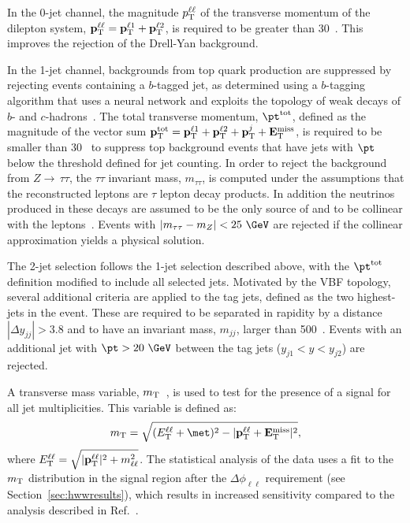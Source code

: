 \documentclass[final,3p,times,twocolumn]{elsarticle}
\newcommand{\mT}{\ensuremath{m_{\rm T}}}
\newcommand{\pTll}{\ensuremath{p_{\rm T}^{\ell\ell}}}
\newcommand{\ptll}{\pTll}
\newcommand{\vpTll}{\ensuremath{{\bf p}_{\rm T}^{\ell\ell}}}
\newcommand{\ZeroJet}{\mbox{0-jet}}
\newcommand{\OneJet}{\mbox{1-jet}}
\newcommand{\TwoJet}{\mbox{2-jet}}
\begin{document}
In the \ZeroJet{} channel, the magnitude $\ptll$ of the transverse momentum of the 
dilepton system, $\vpTll = {\bf p}_{\rm T}^{\ell 1} + {\bf p}_{\rm T}^{\ell 2}$,
is required to be greater than 30~\GeV{}. This improves the rejection of the Drell-Yan background.

In the \OneJet{} channel, backgrounds from top quark production are suppressed by
rejecting events containing a $b$-tagged jet, as determined using a
$b$-tagging algorithm that uses a neural network
and exploits the topology of weak decays of $b$- and $c$-hadrons~\cite{ATLAS-btag-algs}. 
The total transverse momentum, $\pt^{\rm tot}$,
defined as the magnitude of the vector sum
${\bf p}_{\rm T}^{\rm tot}={\bf p}_{\rm T}^{\ell 1} +
{\bf p}_{\rm T}^{\ell 2}+{\bf p}_{\rm T}^{j}+{\bf E}_{\rm T}^{\rm miss}$,
is required to be smaller than 30~\GeV{} to suppress top background events  
that have jets with $\pt$ below the threshold defined for jet counting. In order to reject the 
background from $Z{\rightarrow\,}\tau\tau$, 
the $\tau\tau$ invariant mass, $m_{\tau\tau}$, is computed under the assumptions 
that the reconstructed leptons are $\tau$ lepton decay products. In addition  the neutrinos
produced in these decays are assumed to be the only source of \met{} and to be 
collinear with the leptons~\cite{CollApp}.
Events with $|m_{\tau\tau}-m_{Z}|<25~\GeV$ are rejected
if the collinear approximation yields a physical solution.

The \TwoJet{} selection 
follows the \OneJet{} selection described above, with the $\pt^{\rm tot}$
definition modified to include all selected jets. Motivated by the VBF topology,
several additional criteria are applied to the tag jets, defined as
the two highest-\pt{} jets in the event.
These are required to be separated in rapidity by a distance $|\Delta y_{jj}| > 3.8$ and to have 
an invariant mass, $m_{jj}$, larger than 500~\GeV. 
Events with an additional jet with  $\pt > 20~\GeV$  between the tag jets ($y_{j1} < y < y_{j2}$) 
are rejected. 

A transverse mass variable, \mT~\cite{Barr:2009mx}, is used to test for the 
presence of a signal for all jet multiplicities. This variable is defined as: 
\begin{displaymath}
  \label{eq:mT}
  \mT = \sqrt{(E_{\rm T}^{\ell\ell}+\met)^{2} - |\vpTll+{\bf E}_{\rm T}^{\rm miss}|^{2}},
\end{displaymath}
where $E_{\rm T}^{\ell\ell} = \sqrt{|\vpTll|^{2}+m_{\ell\ell}^{2}}$.  
The statistical analysis of the data 
uses a fit to the $\mT$ distribution in the signal 
region after the $\Delta\phi_{\ell\ell}$
requirement (see Section~\ref{sec:hwwresults}), which results in increased sensitivity compared to the 
analysis described in Ref.~\cite{ATLAS-2fbHWW}. 
\end{document}
